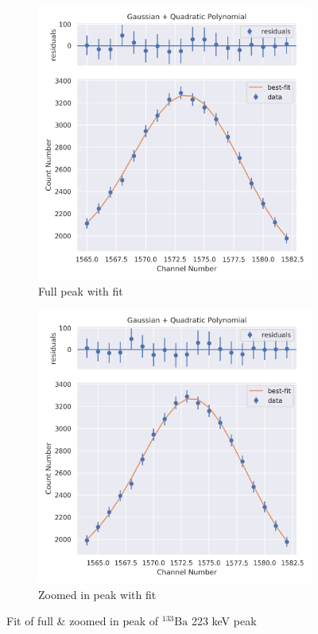 \documentclass[11pt,a4paper]{article}
\newcommand{\element}[2]{$^{#2}\textrm{#1}$}
\begin{document}
\begin{figure}[H]
  \centering
  \begin{subfigure}{.5\linewidth}
    \centering
    \includegraphics[width=\linewidth]{./Images/Barium133/Quad/Quad_3_Full.png}
    \caption{Full peak with fit}
  \end{subfigure}%
  \begin{subfigure}{.5\linewidth}
    \centering
    \includegraphics[width=\linewidth]{./Images/Barium133/Quad/Quad_3_Zoom.png}
    \caption{Zoomed in peak with fit}
  \end{subfigure}
  \caption{Fit of full \& zoomed in peak of \element{Ba}{133} 223 keV peak}
\end{figure}
\end{document}
